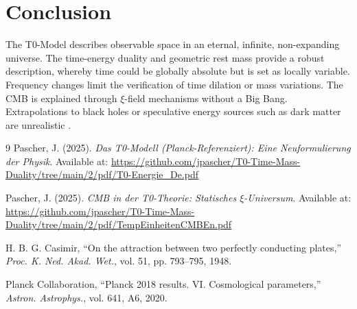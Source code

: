 \section{Conclusion}
\label{sec:conclusion}

The T0-Model describes observable space in an eternal, infinite, non-expanding universe. The time-energy duality and geometric rest mass provide a robust description, whereby time could be globally absolute but is set as locally variable. Frequency changes limit the verification of time dilation or mass variations. The CMB is explained through \(\xi\)-field mechanisms without a Big Bang. Extrapolations to black holes or speculative energy sources such as dark matter are unrealistic \cite{pascher_t0_energy_2025}.

\begin{thebibliography}{9}
	Pascher, J. (2025). \textit{Das T0-Modell (Planck-Referenziert): Eine Neuformulierung der Physik}. 
	Available at: \url{https://github.com/jpascher/T0-Time-Mass-Duality/tree/main/2/pdf/T0-Energie_De.pdf}
	
	Pascher, J. (2025). \textit{CMB in der T0-Theorie: Statisches \(\xi\)-Universum}. 
	Available at: \url{https://github.com/jpascher/T0-Time-Mass-Duality/tree/main/2/pdf/TempEinheitenCMBEn.pdf}
	
	H. B. G. Casimir, ``On the attraction between two perfectly conducting plates,'' \emph{Proc. K. Ned. Akad. Wet.}, vol. 51, pp. 793--795, 1948.
	
	Planck Collaboration, ``Planck 2018 results. VI. Cosmological parameters,'' \emph{Astron. Astrophys.}, vol. 641, A6, 2020.
\end{thebibliography}
